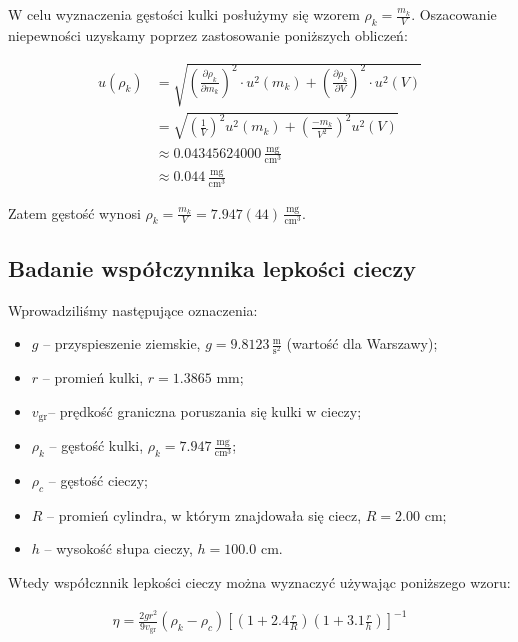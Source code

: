 \documentclass[a4paper]{article}
\begin{document}
W celu wyznaczenia gęstości kulki posłużymy się wzorem $\rho_k = \frac{m_k}{V}$.
Oszacowanie niepewności uzyskamy poprzez zastosowanie poniższych obliczeń:

\begin{align*}
	u(\rho_k) &= \sqrt{\left(\frac{\partial \rho_k}{\partial m_k}\right)^2 \cdot u^2(m_k) + \left(\frac{\partial \rho_k}{\partial V}\right)^2 \cdot u^2(V)} \\
	&= \sqrt{\left(\frac 1 V\right)^2 u^2(m_k) + \left(\frac{-m_k}{V^2}\right)^2 u^2(V)} \\
	&\approx 0.04345624000 \, \frac{\text{mg}}{\text{cm}^3} \\
	&\approx 0.044 \, \frac{\text{mg}}{\text{cm}^3}
\end{align*}

Zatem gęstość wynosi $\rho_k = \frac{m_k}{V} = 7.947 (44) \, \frac{\text{mg}}{\text{cm}^3}$.

\subsection{Badanie współczynnika lepkości cieczy}

\newcommand{\vgr}{\ensuremath{v_{\text{gr}}}}

Wprowadziliśmy następujące oznaczenia:

\begin{itemize}
	\item $g$ -- przyspieszenie ziemskie, $g = 9.8123 \, \frac{\text{m}}{\text{s}^2}$ (wartość dla Warszawy);
	\item $r$ -- promień kulki, $r = 1.3865$ mm;
	\item \vgr -- prędkość graniczna poruszania się kulki w cieczy;
	\item $\rho_k$ -- gęstość kulki, $\rho_k = 7.947 \, \frac{\text{mg}}{\text{cm}^3}$;
	\item $\rho_c$ -- gęstość cieczy;
	\item $R$ -- promień cylindra, w którym znajdowała się ciecz, $R = 2.00$ cm;
	\item $h$ -- wysokość słupa cieczy, $h = 100.0$ cm.
\end{itemize}

Wtedy współcznnik lepkości cieczy można wyznaczyć używając poniższego wzoru:

\begin{align}
\eta = \frac{2 g r^2}{9 v_{\text{gr}}}(\rho_k - \rho_c)\left[(1 + 2.4 \frac r R)(1 + 3.1 \frac r h)\right]^{-1} \label{eq_lepkosc}
\end{align}
\end{document}
